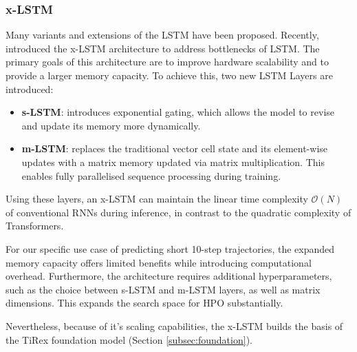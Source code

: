    \subsubsection{x-LSTM} 
    Many variants and extensions of the \ac{LSTM} have been proposed.
    Recently, \textcite{beck2024xlstmextendedlongshortterm} introduced the \ac{x-LSTM} architecture to address bottlenecks of \ac{LSTM}. The primary goals of this architecture are to improve hardware scalability and to provide a larger memory capacity. To achieve this, two new \ac{LSTM} Layers are introduced:
    
    \begin{itemize}
        \item \textbf{\ac{s-LSTM}}: introduces exponential gating, which allows the model to revise and update its memory more dynamically.
        \item \textbf{\ac{m-LSTM}}: replaces the traditional vector cell state and its element-wise updates with a matrix memory updated via matrix multiplication. This %
        enables fully parallelised sequence processing during training.
    \end{itemize}
    Using these layers, an \ac{x-LSTM} can maintain the linear time complexity $\mathcal{O}(N)$ of conventional \acp{RNN} during inference, in contrast to the quadratic complexity of Transformers. \parencite{beck2024xlstmextendedlongshortterm, attentioniayn} %
    
    For our specific use case of predicting short 10-step trajectories, the expanded memory capacity offers limited benefits while introducing computational overhead. Furthermore, the architecture requires additional hyperparameters, such as the choice between \ac{s-LSTM} and \ac{m-LSTM} layers, as well as matrix dimensions. %
    This expands the search space for \ac{HPO} substantially.%
    
    Nevertheless, because of it's scaling capabilities, the \ac{x-LSTM} builds the basis of the TiRex foundation model (Section \ref{subsec:foundation}).

